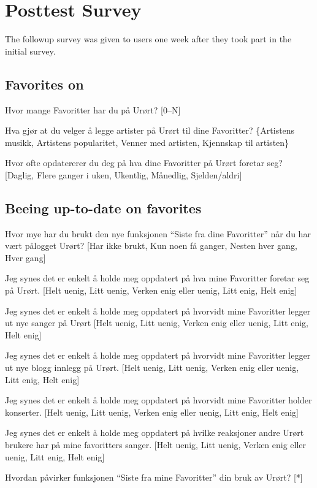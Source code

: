 \section{Posttest Survey}

The followup survey was given to users one week after they took part in the
initial survey.

\subsection{Favorites on \urort{}}

\begin{enum}
  \item Hvor mange Favoritter har du på Urørt?
    [0--N]
  \item Hva gjør at du velger å legge artister på Urørt til dine Favoritter?
    \{Artistens musikk, Artistens popularitet, Venner med artisten,
    Kjennskap til artisten\}
  \item  Hvor ofte opdatererer du deg på hva dine Favoritter på Urørt
    foretar seg?
    [Daglig, Flere ganger i uken, Ukentlig, Månedlig, Sjelden/aldri]
\end{enum}

\subsection{Beeing up-to-date on favorites}

\begin{enum}
  \item Hvor mye har du brukt den nye funksjonen ``Siste fra dine Favoritter''
    når du har vært pålogget Urørt?
    [Har ikke brukt, Kun noen få ganger, Nesten hver gang, Hver gang]
  \item Jeg synes det er enkelt å holde meg oppdatert på
    hva mine Favoritter foretar seg på Urørt.
    [Helt uenig, Litt uenig, Verken enig eller uenig, Litt enig, Helt enig]
  \item Jeg synes det er enkelt å holde meg oppdatert på
    hvorvidt mine Favoritter legger ut nye sanger på Urørt
    [Helt uenig, Litt uenig, Verken enig eller uenig, Litt enig, Helt enig]
  \item Jeg synes det er enkelt å holde meg oppdatert på
    hvorvidt mine Favoritter legger ut nye blogg innlegg på Urørt.
    [Helt uenig, Litt uenig, Verken enig eller uenig, Litt enig, Helt enig]
  \item Jeg synes det er enkelt å holde meg oppdatert på
    hvorvidt mine Favoritter holder konserter.
    [Helt uenig, Litt uenig, Verken enig eller uenig, Litt enig, Helt enig]
  \item Jeg synes det er enkelt å holde meg oppdatert på
    hvilke reaksjoner andre Urørt brukere har på mine favoritters sanger.
    [Helt uenig, Litt uenig, Verken enig eller uenig, Litt enig, Helt enig]
  \item Hvordan påvirker funksjonen ``Siste fra mine Favoritter'' din bruk av
    Urørt? [*]
\end{enum}


